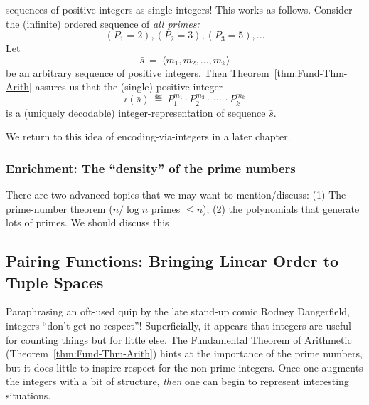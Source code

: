sequences of positive integers as single integers!  This works as
follows.  Consider the (infinite) ordered sequence of {\em all primes:}
\[ (P_1 = 2), (P_2 = 3), (P_3 = 5), \ldots  \]
Let
\begin{equation}
\label{eq:sequence-vec-s}
\bar{s} \ = \ \langle m_1, m_2, \ldots, m_k \rangle
\end{equation}
be an arbitrary sequence of positive integers.  Then
Theorem~\ref{thm:Fund-Thm-Arith} assures us that the (single) positive
integer
\[ 
\iota(\bar{s}) \ \eqdef \ P_1^{m_1} \cdot P_2^{m_2} \cdot \ \cdots \
\cdot P_k^{m_k}
\]
is a (uniquely decodable) integer-representation of sequence $\bar{s}$.

We return to this idea of encoding-via-integers in a later chapter.

\subsubsection{Enrichment: The ``density'' of the prime numbers}
\label{sec:Prime-Number-Theorem}

{\Arny There are two advanced topics that we may want to
  mention/discuss: (1) The prime-number theorem ($n/ \log n$ primes
  $\leq n$); (2) the polynomials that generate lots of primes.  We
  should discuss this}


\subsection{Pairing Functions: Bringing Linear Order to Tuple Spaces}
\label{sec:pairing}

Paraphrasing an oft-used quip by the late stand-up comic Rodney
Dangerfield, integers ``don't get no respect''!  Superficially, it
appears that integers are useful for counting things but for little
else.  The Fundamental Theorem of Arithmetic
(Theorem~\ref{thm:Fund-Thm-Arith}) hints at the importance of the
prime numbers, but it does little to inspire respect for the non-prime
integers.  Once one augments the integers with a bit of structure,
{\em then} one can begin to represent interesting situations.

